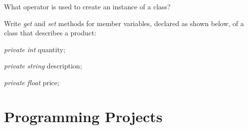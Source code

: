 {\begin{list}{E \thechapter.\theenumi}

\item What operator is used to create an instance of a class?


\item Write \emph{get} and \emph{set} methods for member
variables, declared as shown below, of  a class that describes a
product:



\begin{list}{.}%
{\itemsep 0.05in \parskip 0in \parsep 0in}

\item \emph{private int} quantity;

\item  \emph{private string} description;

\item  \emph{private float} price;

\end{list}


\end{list}


}   %



\newpage
{\samepage\vspace{1ex}\noindent\usebox{\phicsep}\vspace{1.5ex}}
\vspace{-0.4in}
\section{Programming Projects}

